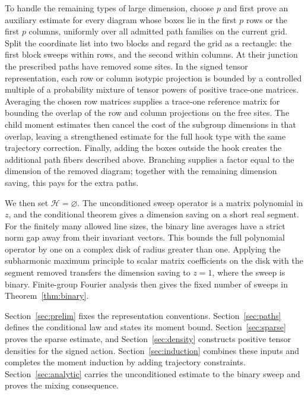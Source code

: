 To handle the remaining types of large dimension, choose \(p\) and first
prove an auxiliary estimate for every diagram whose boxes lie in the
first \(p\) rows or the first \(p\) columns, uniformly over all admitted
path families on the current grid. Split the coordinate list into two
blocks and regard the grid
as a rectangle: the first block sweeps within rows, and the second
within columns. At their junction the prescribed paths have removed
some sites. In the signed tensor representation, each row or column
isotypic projection is bounded by a controlled multiple of a probability
mixture of tensor powers of positive trace-one matrices. Averaging the
chosen row matrices supplies a trace-one reference matrix for bounding
the overlap of the row and column projections on the free sites.
The child moment estimates then cancel the cost of the subgroup dimensions in
that overlap, leaving a strengthened estimate for the full hook type
with the same trajectory correction. Finally, adding the boxes outside
the hook creates the additional path fibers described above. Branching
supplies a factor equal to the dimension of the removed diagram; together
with the remaining dimension saving, this pays for the extra paths.

We then set \(\mathcal H=\varnothing\). The unconditioned sweep operator
is a matrix polynomial in \(z\), and the conditional theorem gives a
dimension saving on a short real segment. For the finitely many allowed
line sizes, the binary line averages have a strict norm gap away from
their invariant vectors. This bounds the full polynomial operator by
one on a complex disk of radius greater than one. Applying the
subharmonic maximum principle to scalar matrix coefficients on the disk
with the segment removed transfers the dimension saving to \(z=1\),
where the sweep is binary. Finite-group Fourier analysis then gives the
fixed number of sweeps in Theorem~\ref{thm:binary}.

Section~\ref{sec:prelim} fixes the representation conventions.
Section~\ref{sec:paths} defines the conditional law and states its moment
bound. Section~\ref{sec:sparse} proves the sparse estimate, and
Section~\ref{sec:density} constructs positive tensor densities for the
signed action. Section~\ref{sec:induction} combines these inputs and
completes the moment induction by adding trajectory constraints.
Section~\ref{sec:analytic} carries the
unconditioned estimate to the binary sweep and proves the mixing
consequence.

